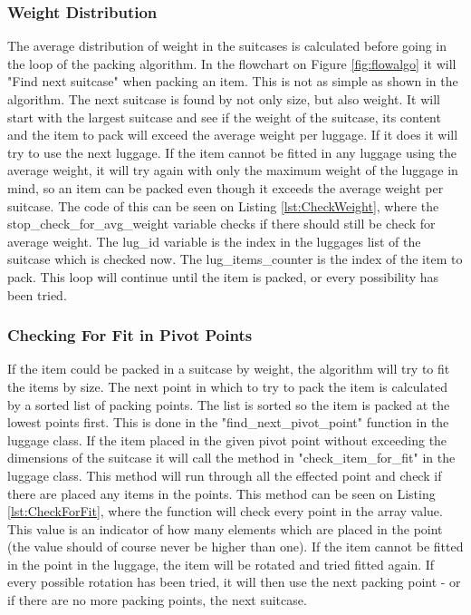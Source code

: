 \subsubsection{Weight Distribution}
The average distribution of weight in the suitcases is calculated before going in the loop of the packing algorithm. In the flowchart on Figure \ref{fig:flowalgo} it will "Find next suitcase" when packing an item. This is not as simple as shown in the algorithm. The next suitcase is found by not only size, but also weight. It will start with the largest suitcase and see if the weight of the suitcase, its content and the item to pack will exceed the average weight per luggage. If it does it will try to use the next luggage. If the item cannot be fitted in any luggage using the average weight, it will try again with only the maximum weight of the luggage in mind, so an item can be packed even though it exceeds the average weight per suitcase. The code of this can be seen on Listing \ref{lst:CheckWeight}, where the stop\_check\_for\_avg\_weight variable checks if there should still be check for average weight. The lug\_id variable is the index in the luggages list of the suitcase which is checked now. The lug\_items\_counter is the index of the item to pack. This loop will continue until the item is packed, or every possibility has been tried.
\subsubsection{Checking For Fit in Pivot Points}
If the item could be packed in a suitcase by weight, the algorithm will try to fit the items by size. The next point in which to try to pack the item is calculated by a sorted list of packing points. The list is sorted so the item is packed at the lowest points first. This is done in the "find\_next\_pivot\_point" function in the luggage class. If the item placed in the given pivot point without exceeding the dimensions of the suitcase it will call the method in "check\_item\_for\_fit" in the luggage class. This method will run through all the effected point and check if there are placed any items in the points. This method can be seen on Listing \ref{lst:CheckForFit}, where the function will check every point in the array value. This value is an indicator of how many elements which are placed in the point (the value should of course never be higher than one).
If the item cannot be fitted in the point in the luggage, the item will be rotated and tried fitted again. If every possible rotation has been tried, it will then use the next packing point - or if there are no more packing points, the next suitcase.
